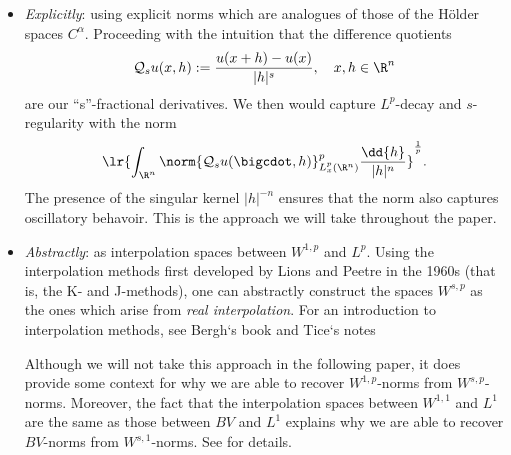 \documentclass[../main.tex]{subfiles}
\begin{document}
\begin{itemize}
    \item \textit{Explicitly}: using explicit norms which are analogues of those of the H\"older spaces $ C^{\alpha} $. Proceeding with the intuition that the difference quotients 
        \[
            \mathcal{Q}_{s}u(x,h):= \frac{u(x+h)-u(x)}{|h|^{s}},\quad x,h\in \R^{n}
        \]
    are our ``s''-fractional derivatives. We then would capture $ L^{p} $-decay and $ s $-regularity with the norm
    \[
        \lr{\int_{\R^{n}} \norm{\mathcal{Q}_{s}u(\bigcdot,h)}_{L^{p}_{x}(\R^{n})}^{p}\frac{\dd{h}}{|h|^{n}}}^{\frac{1}{p}}.
    \]
    The presence of the singular kernel $ |h|^{-n} $ ensures that the norm also captures oscillatory behavoir. This is the approach we will take throughout the paper.\\

    \item \textit{Abstractly}: as interpolation spaces between $ W^{1,p} $ and $ L^{p} $. Using the interpolation methods first developed by Lions and Peetre in the 1960s (that is, the K- and J-methods), one can abstractly construct the spaces $ W^{s,p} $ as the ones which arise from \textit{real interpolation}. For an introduction to interpolation methods, see Bergh`s book \cite{bergh:interpolation} and Tice`s notes \cite{}

    Although we will not take this approach in the following paper, it does provide some context for why we are able to recover $ W^{1,p} $-norms from $ W^{s,p} $-norms. Moreover, the fact that the interpolation spaces between $ W^{1,1} $ and $ L^{1} $ are the same as those between $ BV $ and $ L^{1} $ explains why we are able to recover $ BV $-norms from $ W^{s,1} $-norms. See \cite{ponce:2017} for details.
\end{itemize}
\end{document}
